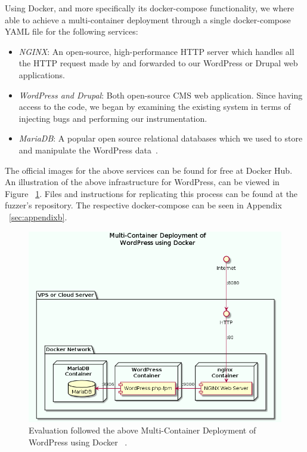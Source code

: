 Using Docker, and more specifically its docker-compose functionality, we where able to achieve a multi-container deployment through a single docker-compose YAML file for the following services:

\begin{itemize}
	\item \emph{NGINX}: An open-source, high-performance HTTP server which handles all the HTTP request made by \pname{} and forwarded to our WordPress or Drupal web applications.{~\cite{nginx}}
	\item \emph{WordPress and Drupal}: Both open-source CMS web application. Since having access to the code, we began by examining the existing system in terms of injecting bugs and performing our instrumentation.
	\item \emph{MariaDB}: A popular open source relational databases which we used to store and manipulate the WordPress data~\cite{mariadb}.
\end{itemize}

The official images for the above services can be found for free at Docker Hub. An illustration of the above infrastructure for WordPress, can be viewed in Figure ~\ref{fig:multi-container}. Files and instructions for replicating this process can be found at the fuzzer's repository. The respective docker-compose can be seen in Appendix ~\ref{sec:appendixb}.

\begin{figure}[ht]
 \centering
 \captionsetup{justification=centering}
 \includegraphics[width=\linewidth]{figures/multi-container.png}
 \caption[Multi-Container Deployment of WordPress using Docker]{Evaluation followed the above Multi-Container Deployment of WordPress using Docker ~\cite{multi-container}.}
 \label{fig:multi-container}
\end{figure}


